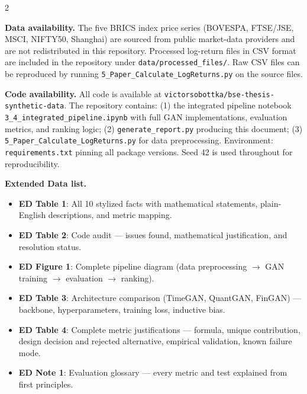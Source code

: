 \documentclass[10pt]{article}
\begin{document}
\begin{multicols}{2}
\small

\textbf{Data availability.}
The five BRICS index price series (BOVESPA, FTSE/JSE, MSCI, NIFTY50, Shanghai) are sourced from public market-data providers and are not redistributed in this repository. Processed log-return files in CSV format are included in the repository under \texttt{data/processed\_files/}. Raw CSV files can be reproduced by running \texttt{5\_Paper\_Calculate\_LogReturns.py} on the source files.

\textbf{Code availability.}
All code is available at \texttt{victorsobottka/bse-thesis-synthetic-data}. The repository contains: (1) the integrated pipeline notebook \texttt{3\_4\_integrated\_pipeline.ipynb} with full GAN implementations, evaluation metrics, and ranking logic; (2) \texttt{generate\_report.py} producing this document; (3) \texttt{5\_Paper\_Calculate\_LogReturns.py} for data preprocessing. Environment: \texttt{requirements.txt} pinning all package versions. Seed 42 is used throughout for reproducibility.

\columnbreak

\textbf{Extended Data list.}
\begin{itemize}[noitemsep,topsep=1pt]
  \item \textbf{ED Table 1}: All 10 stylized facts with mathematical statements, plain-English descriptions, and metric mapping.
  \item \textbf{ED Table 2}: Code audit --- issues found, mathematical justification, and resolution status.
  \item \textbf{ED Figure 1}: Complete pipeline diagram (data preprocessing $\to$ GAN training $\to$ evaluation $\to$ ranking).
  \item \textbf{ED Table 3}: Architecture comparison (TimeGAN, QuantGAN, FinGAN) --- backbone, hyperparameters, training loss, inductive bias.
  \item \textbf{ED Table 4}: Complete metric justifications --- formula, unique contribution, design decision and rejected alternative, empirical validation, known failure mode.
  \item \textbf{ED Note 1}: Evaluation glossary --- every metric and test explained from first principles.
\end{itemize}

\end{multicols}

\clearpage

\end{document}
